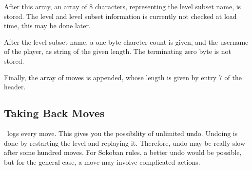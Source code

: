 After this array, an array of 8 characters, representing the level subset name,
is stored. The level and level subset information is currently not checked
at load time, this may be done later.

After the level subset name, a one-byte charcter count is given, and the
username of the player, as string of the given length. The terminating zero
byte is not stored.

Finally, the array of moves is appended, whose length is given by entry 7 of
the header.


\subsection{Taking Back Moves}
\xsok\ logs every move. This gives you the possibility of unlimited undo.
Undoing is done by restarting the level and replaying it.
Therefore, undo may be really slow after some hundred moves.
For Sokoban rules, a better undo would be possible, but for the general
case, a move may involve complicated actions.

